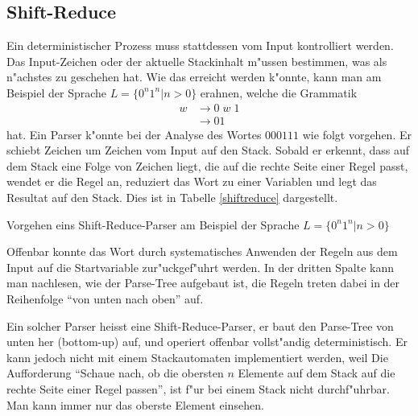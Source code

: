 \subsection{Shift-Reduce}
Ein deterministischer Prozess muss stattdessen vom Input kontrolliert werden.
Das Input-Zeichen oder der aktuelle Stackinhalt m"ussen bestimmen, was
als n"achstes zu geschehen hat. Wie das erreicht werden k"onnte, kann man am
Beispiel der Sprache $L=\{0^n1^n|n> 0\}$ erahnen, welche die
Grammatik
\begin{align}
w&\rightarrow 0\;w\;1\tag{1}\\
&\rightarrow 01\tag{2}
\end{align}
hat. Ein Parser k"onnte bei der Analyse des Wortes $000111$ wie folgt vorgehen.
Er schiebt Zeichen um Zeichen vom Input auf den Stack. Sobald
er erkennt, dass auf dem Stack eine Folge von Zeichen liegt, die auf die rechte
Seite einer Regel passt, wendet er die Regel an, reduziert das Wort zu einer
Variablen und legt das Resultat auf den Stack. Dies ist in Tabelle \ref{shiftreduce}
dargestellt.

\begin{table}

\caption{Vorgehen eins Shift-Reduce-Parser am Beispiel der Sprache $L=\{0^n1^n|n>0\}$
\label{shiftreduce}}
\end{table}
Offenbar konnte das Wort durch systematisches Anwenden der Regeln aus dem Input
auf die Startvariable zur"uckgef"uhrt werden.
In der dritten Spalte kann man nachlesen, wie der Parse-Tree aufgebaut ist,
die Regeln treten dabei in der Reihenfolge ``von unten nach oben'' auf.

Ein solcher Parser heisst eine Shift-Reduce-Parser, er baut den Parse-Tree von unten
her (bottom-up) auf, und operiert offenbar vollst"andig deterministisch.
Er kann jedoch nicht mit einem Stackautomaten implementiert werden,
weil Die Aufforderung ``Schaue nach, ob die obersten $n$ Elemente auf dem Stack
auf die rechte Seite einer Regel passen'', ist f"ur bei einem Stack nicht
durchf"uhrbar. Man kann immer nur das oberste Element einsehen.


